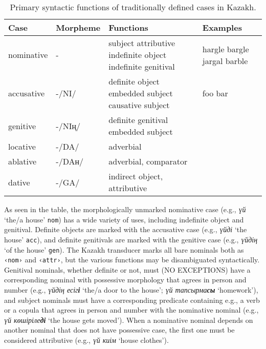 \documentclass[a4paper,11pt, onecolumn,twoside]{article}
\newcommand{\gmk}[1]{{\rm {\sc \texttt{#1}}}}
\newcommand{\kazakh}[1]{{\em #1}}
\newcommand{\gloss}[1]{`#1'}
\newcommand{\tag}[1]{\texttt{‹#1›}}
\begin{document}
\begin{table}[htbp]
	\centering
	\caption{Primary syntactic functions of traditionally defined cases in Kazakh.}\label{tab:cases}
	\begin{small}
		\begin{tabular}{l p{5em} p{8em} p{22em}}
			\toprule
				\textbf{Case} & \textbf{Morpheme} & \textbf{Functions} & \textbf{Examples} \\
			\midrule
				nominative & - & subject\newline
										attributive\newline
										indefinite object\newline
										indefinite genitival 
									& hargle bargle \newline
										jargal barble \newline 
										\\
				accusative & -/NI/ & definite object\newline
											embedded subject\newline
											causative subject
										& foo \newline
											bar \\
				genitive & -/NIң/ & definite genitival\newline
											embedded subject \\
				locative & -/DA/ & adverbial
										& \\
				ablative & -/DAн/ & adverbial,\newline
											comparator \\
				dative & -/GA/ & indirect object,\newline
										attributive
									& \\
			\bottomrule
		\end{tabular}
	\end{small}
\end{table}

As seen in the table, the morphologically unmarked nominative case (e.g., \kazakh{үй} \gloss{the/a house} \gmk{nom}) has a wide variety of uses, including indefinite object and genitival.  Definite objects are marked with the accusative case (e.g., \kazakh{үйді} \gloss{the house} \gmk{acc}), and definite genitivals are marked with the genitive case (e.g., \kazakh{үйдің} \gloss{of the house} \gmk{gen}).  The Kazakh transducer marks all bare nominals both as \tag{nom} and \tag{attr}, but the various functions may be disambiguated syntactically.  Genitival nominals, whether definite or not, must (NO EXCEPTIONS) have a corresponding nominal with possessive morphology that agrees in person and number (e.g., \kazakh{үйдің есіг\textbf{і}} \gloss{the/a door to the house}; \kazakh{үй тапсырма\textbf{сы}} \gloss{homework}), and subject nominals must have a corresponding predicate containing e.g., a verb or a copula that agrees in person and number with the nominative nominal (e.g., \kazakh{үй көшіріле\textbf{ді}} \gloss{the house gets moved}).  When a nominative nominal depends on another nominal that does not have possessive case, the first one must be considered attributive (e.g., \kazakh{үй киім} \gloss{house clothes}).
\end{document}
